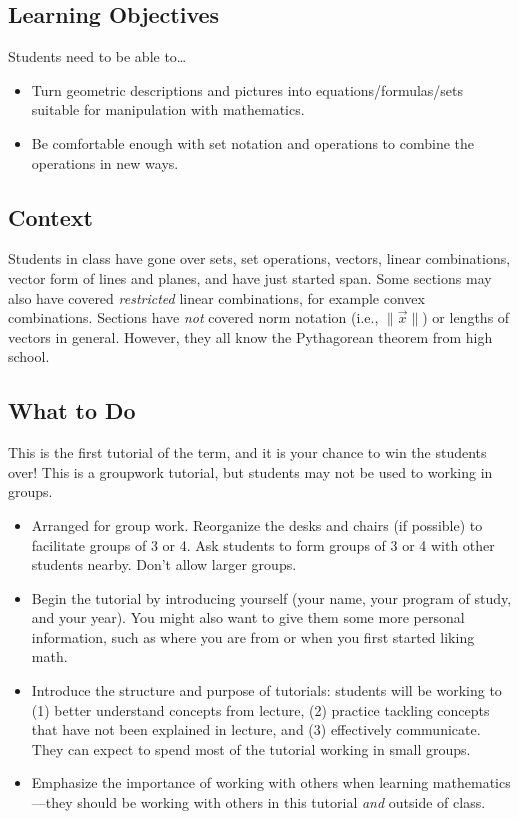 		\subsection*{Learning Objectives} Students need to be able to\ldots
		\begin{itemize}
			\item Turn geometric descriptions and pictures into equations/formulas/sets
				suitable for manipulation with mathematics.

			\item Be comfortable enough with set notation and operations to combine
				the operations in new ways.
		\end{itemize}


		\subsection*{Context} Students in class have gone over sets, set operations,
		vectors, linear combinations, vector form of lines and planes, and have just started
		span. Some sections may also have covered \emph{restricted} linear combinations, for example
		convex combinations. Sections have \emph{not} covered norm notation (i.e., $\|\vec x\|$) or
		lengths of vectors in general. However, they all know the Pythagorean theorem from high school.


		\subsection*{What to Do} This is the first tutorial of the term, and
		it is your chance to win the students over! This is a groupwork tutorial,
		but students may not be used to working in groups.

		\begin{itemize}
			\item Arranged for group work. Reorganize the desks and chairs
				(if possible) to facilitate groups of 3 or 4. Ask
				students to form groups of 3 or 4 with other students
				nearby. Don't allow larger groups.

			\item Begin the tutorial by introducing yourself (your name,
				your program of study, and your year). You might
				also want to give them some more personal information,
				such as where you are from or when you first started liking math.

			\item Introduce the structure and purpose of tutorials: students
				will be working to (1) better understand concepts
				from lecture, (2) practice tackling concepts that
				have not been explained in lecture, and (3) effectively
				communicate. They can expect to spend most of the
				tutorial working in small groups.

			\item Emphasize the importance of working with others when
				learning mathematics---they should be working with
				others in this tutorial \emph{and} outside of
				class.
		\end{itemize}

